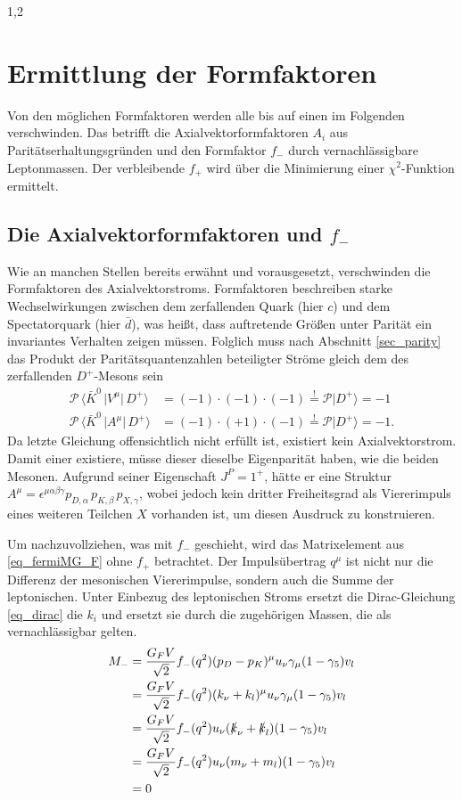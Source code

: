 \documentclass[11pt,a4paper,twoside]{report}
\begin{document}
\begin{spacing}{1,2}
\section{Ermittlung der Formfaktoren}
Von den möglichen Formfaktoren werden alle bis auf einen im Folgenden verschwinden. Das betrifft die Axialvektorformfaktoren $A_i$ aus 
Paritätserhaltungsgründen und den Formfaktor $f_-$ durch vernachlässigbare Leptonmassen. Der verbleibende $f_+$ wird über die Minimierung einer
$\chi^2$-Funktion ermittelt.

\subsection{Die Axialvektorformfaktoren und $f_-$}
Wie an manchen Stellen bereits erwähnt und vorausgesetzt, verschwinden die Formfaktoren des Axialvektorstroms. Formfaktoren beschreiben starke 
Wechselwirkungen zwischen dem zerfallenden Quark (hier $c$) und dem Spectatorquark (hier $\bar d$), was heißt, dass auftretende Größen unter Parität
ein invariantes Verhalten zeigen müssen. Folglich muss nach Abschnitt \ref{sec_parity} das Produkt der Paritätsquantenzahlen beteiligter Ströme gleich dem
des zerfallenden $D^+$-Mesons sein
\begin{align}
 \mathcal{P} \, \big\langle\bar K^0\,\big|V^\mu|\,D^+\big\rangle &= (-1)\cdot(-1)\cdot(-1) \stackrel{!}{=} \mathcal{P} \big|D^+\big\rangle = -1 \nonumber \\
 \mathcal{P} \, \big\langle\bar K^0\,\big|A^\mu|\,D^+\big\rangle &= (-1)\cdot(+1)\cdot(-1) \stackrel{!}{=} \mathcal{P} \big|D^+\big\rangle = -1. \nonumber
\end{align}
Da letzte Gleichung offensichtlich nicht erfüllt ist, existiert kein Axialvektorstrom. Damit einer existiere, müsse dieser dieselbe Eigenparität haben,
wie die beiden Mesonen. Aufgrund seiner Eigenschaft $J^P = 1^+$, hätte er eine Struktur 
$A^\mu = \epsilon^{\mu \alpha \beta \gamma}p_{D,\alpha}\,p_{K,\beta}\,p_{X,\gamma}$, wobei jedoch kein dritter Freiheitsgrad als Viererimpuls eines
weiteren Teilchen $X$ vorhanden ist, um diesen Ausdruck zu konstruieren.

Um nachzuvollziehen, was mit $f_-$ geschieht, wird das Matrixelement aus \eqref{eq_fermiMG_F} ohne $f_+$ betrachtet. Der Impulsübertrag $q^\mu$ ist nicht
nur die Differenz der mesonischen Viererimpulse, sondern auch die Summe der leptonischen. Unter Einbezug des leptonischen Stroms ersetzt die Dirac-Gleichung
\eqref{eq_dirac} die $k_i$ und ersetzt sie durch die zugehörigen Massen, die als vernachlässigbar gelten.
\begin{align}
 M_- &= \frac{G_F V}{\sqrt{2}} f_-(q^2)(p_D-p_K)^\mu u_\nu \gamma_\mu(1-\gamma_5)v_l\nonumber\\
 &= \frac{G_F V}{\sqrt{2}} f_-(q^2)(k_\nu+k_l)^\mu u_\nu \gamma_\mu(1-\gamma_5)v_l\nonumber\\
 &=\frac{G_F V}{\sqrt{2}} f_-(q^2)u_\nu (\slashed{k}_\nu + \slashed{k}_l) (1-\gamma_5)v_l\nonumber\\
 &=\frac{G_F V}{\sqrt{2}} f_-(q^2)u_\nu (m_\nu + m_l) (1-\gamma_5)v_l\nonumber \\
 &=0
 \end{align}


\end{spacing}
\end{document}
